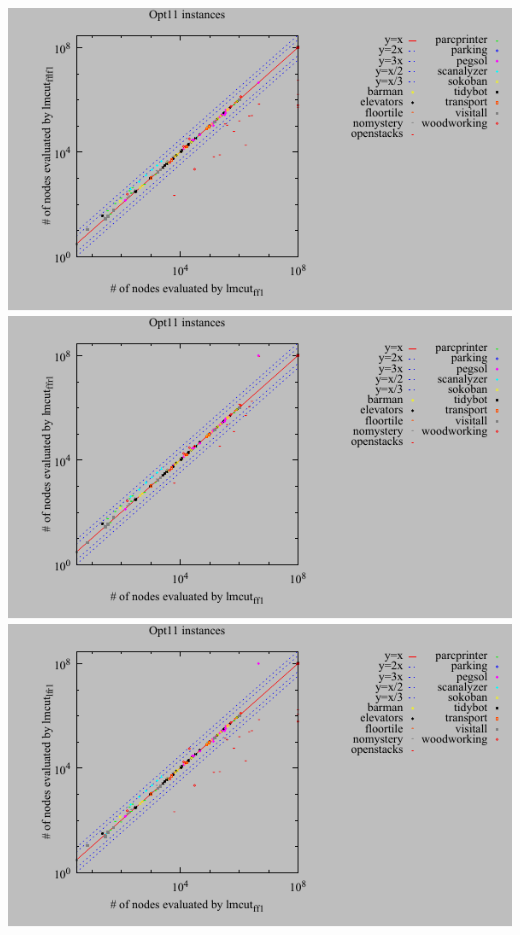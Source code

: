 \includegraphics{tables/opt11-evaluated-lmcut_ff-lmcut_fflf.pdf}
\linebreak
\includegraphics{tables/opt11-evaluated-lmcut_ff-lmcut_ffr.pdf}
\linebreak
\includegraphics{tables/opt11-evaluated-lmcut_ff-lmcut_lfr.pdf}
\linebreak
